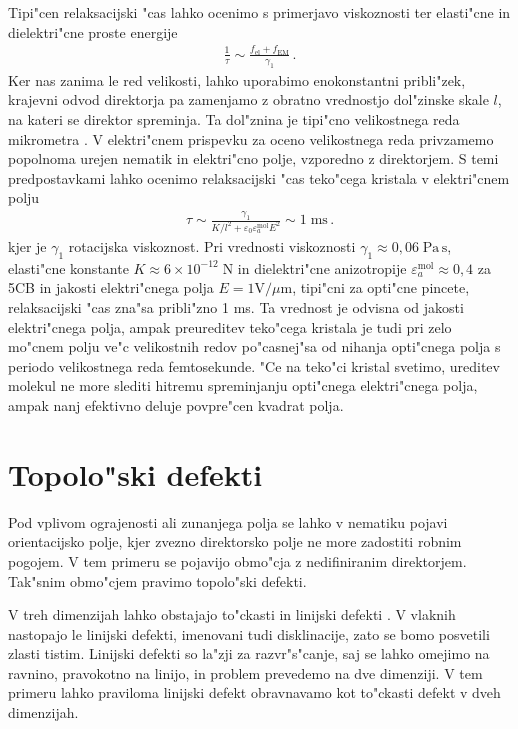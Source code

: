 \documentclass[12pt,twoside,openright,final]{report}
\begin{document}
Tipi"cen relaksacijski "cas lahko ocenimo s primerjavo viskoznosti ter elasti"cne in dielektri"cne proste energije
\begin{align}
 \frac{1}{\tau} \sim \frac{f_\mathrm{el} + f_\mathrm{EM}}{\gamma_1}\,.
\end{align}
Ker nas zanima le red velikosti, lahko uporabimo enokonstantni pribli"zek, krajevni odvod direktorja pa zamenjamo z obratno vrednostjo dol"zinske skale $l$, na kateri se direktor spreminja. 
Ta dol"znina je tipi"cno velikostnega reda mikrometra \cite{kleman}. 
V elektri"cnem prispevku za oceno velikostnega reda privzamemo popolnoma urejen nematik in elektri"cno polje, vzporedno z direktorjem. 
S temi predpostavkami lahko ocenimo relaksacijski "cas teko"cega kristala v elektri"cnem polju
\begin{align}
 \tau \sim \frac{\gamma_1}{K/l^2 + \varepsilon_0 \varepsilon_a^{\mathrm{mol}} E^2 } \sim 1\;\mathrm{ms}\,.
\end{align}
kjer je $\gamma_1$ rotacijska viskoznost. 
Pri vrednosti viskoznosti $\gamma_1 \approx 0,\!06 \; \mathrm{Pa\,s}$, elasti"cne konstante $K \approx 6\times 10^{-12} \; \mathrm{N}$ in dielektri"cne anizotropije $\varepsilon_a^{\mathrm{mol}} \approx 0,\!4$ za 5CB \cite{diploma-miha,kolicniki} in jakosti elektri"cnega polja $E = 1\mathrm{V}/\mu\mathrm{m}$, tipi"cni za opti"cne pincete, relaksacijski "cas zna"sa pribli"zno 1 ms. 
Ta vrednost je odvisna od jakosti elektri"cnega polja, ampak preureditev teko"cega kristala je tudi pri zelo mo"cnem polju ve"c velikostnih redov po"casnej"sa od nihanja opti"cnega polja s periodo velikostnega reda femtosekunde. 
"Ce na teko"ci kristal svetimo, ureditev molekul ne more slediti hitremu spreminjanju opti"cnega elektri"cnega polja, ampak nanj efektivno deluje povpre"cen kvadrat polja. 

\section{Topolo"ski defekti}

Pod vplivom ograjenosti ali zunanjega polja se lahko v nematiku pojavi orientacijsko polje, kjer zvezno direktorsko polje ne more zadostiti robnim pogojem. 
V tem primeru se pojavijo obmo"cja z nedifiniranim direktorjem. 
Tak"snim obmo"cjem pravimo topolo"ski defekti. 

V treh dimenzijah lahko obstajajo to"ckasti in linijski defekti \cite{degennes,kleman}. 
V vlaknih nastopajo le linijski defekti, imenovani tudi disklinacije, zato se bomo posvetili zlasti tistim. 
Linijski defekti so la"zji za razvr"s"canje, saj se lahko omejimo na ravnino, pravokotno na linijo, in problem prevedemo na dve dimenziji. 
V tem primeru lahko praviloma linijski defekt obravnavamo kot to"ckasti defekt v dveh dimenzijah. 
\end{document}

